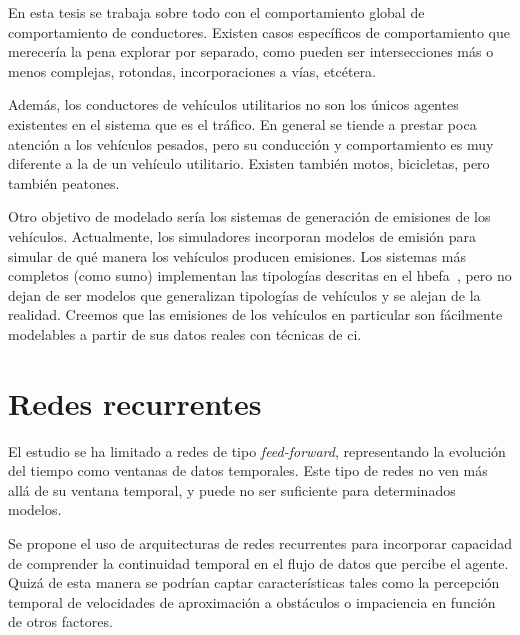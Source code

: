 En esta tesis se trabaja sobre todo con el comportamiento global de comportamiento de conductores. Existen casos específicos de comportamiento que merecería la pena explorar por separado, como pueden ser intersecciones más o menos complejas, rotondas, incorporaciones a vías, etcétera.

Además, los conductores de vehículos utilitarios no son los únicos agentes existentes en el sistema que es el tráfico. En general se tiende a prestar poca atención a los vehículos pesados, pero su conducción y comportamiento es muy diferente a la de un vehículo utilitario. Existen también motos, bicicletas, pero también peatones.

Otro objetivo de modelado sería los sistemas de generación de emisiones de los vehículos. Actualmente, los simuladores incorporan modelos de emisión para simular de qué manera los vehículos producen emisiones. Los sistemas más completos (como \ac{sumo}) implementan las tipologías descritas en el \ac{hbefa}~\cite{de2004modelling}, pero no dejan de ser modelos que generalizan tipologías de vehículos y se alejan de la realidad. Creemos que las emisiones de los vehículos en particular son fácilmente modelables a partir de sus datos reales con técnicas de \ac{ci}.

\section{Redes recurrentes}

El estudio se ha limitado a redes de tipo \textit{feed-forward}, representando la evolución del tiempo como ventanas de datos temporales. Este tipo de redes no ven más allá de su ventana temporal, y puede no ser suficiente para determinados modelos.

Se propone el uso de arquitecturas de redes recurrentes para incorporar capacidad de comprender la continuidad temporal en el flujo de datos que percibe el agente. Quizá de esta manera se podrían captar características tales como la percepción temporal de velocidades de aproximación a obstáculos o impaciencia en función de otros factores.